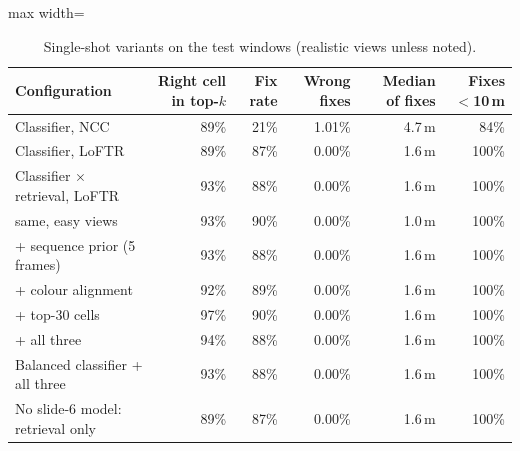 \begin{table}[t]
\centering
\small
\caption{Single-shot variants on the test windows (realistic views unless noted).}
\label{tab:singleshot}
\begin{adjustbox}{max width=\linewidth}
\begin{tabular}{lrrrrr}
\toprule
Configuration & Right cell in top-$k$ & Fix rate & Wrong fixes & Median of fixes & Fixes $<$10\,m \\
\midrule
Classifier, NCC & 89\% & 21\% & 1.01\% & 4.7\,m & 84\% \\
Classifier, LoFTR & 89\% & 87\% & 0.00\% & 1.6\,m & 100\% \\
Classifier $\times$ retrieval, LoFTR & 93\% & 88\% & 0.00\% & 1.6\,m & 100\% \\
\quad same, easy views & 93\% & 90\% & 0.00\% & 1.0\,m & 100\% \\
\quad + sequence prior (5 frames) & 93\% & 88\% & 0.00\% & 1.6\,m & 100\% \\
\quad + colour alignment & 92\% & 89\% & 0.00\% & 1.6\,m & 100\% \\
\quad + top-30 cells & 97\% & 90\% & 0.00\% & 1.6\,m & 100\% \\
\quad + all three & 94\% & 88\% & 0.00\% & 1.6\,m & 100\% \\
Balanced classifier + all three & 93\% & 88\% & 0.00\% & 1.6\,m & 100\% \\
No slide-6 model: retrieval only & 89\% & 87\% & 0.00\% & 1.6\,m & 100\% \\
\bottomrule
\end{tabular}
\end{adjustbox}
\end{table}

